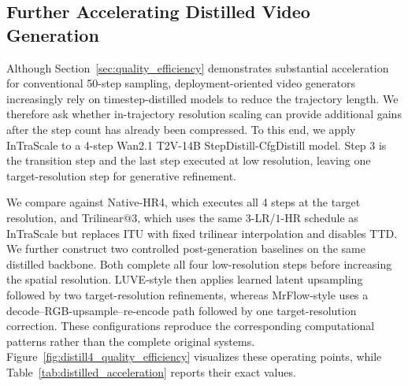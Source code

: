 \documentclass[letterpaper]{article} %
\begin{document}
\subsection{Further Accelerating Distilled Video Generation}
\label{sec:distilled_acceleration}

Although Section~\ref{sec:quality_efficiency} demonstrates substantial
acceleration for conventional 50-step sampling, deployment-oriented
video generators increasingly rely on timestep-distilled models to reduce the
trajectory length. We therefore ask whether in-trajectory resolution scaling
can provide additional gains after the step count has already been
compressed. To this end, we apply InTraScale to a 4-step Wan2.1
T2V-14B StepDistill-CfgDistill model. Step 3 is the transition step
and the last step executed at low resolution, leaving one
target-resolution step for generative refinement.

We compare against Native-HR4, which executes all 4 steps at the
target resolution, and Trilinear@3, which uses the same
\(3\)-LR/\(1\)-HR schedule as InTraScale but replaces ITU with fixed
trilinear interpolation and disables TTD. We further construct two controlled
post-generation baselines on the same distilled backbone. Both complete all
four low-resolution steps before increasing the spatial resolution.
LUVE-style then applies learned latent upsampling followed by two
target-resolution refinements, whereas MrFlow-style uses a
decode--RGB-upsample--re-encode path followed by one target-resolution
correction. These configurations reproduce the corresponding computational
patterns rather than the complete original systems.
Figure~\ref{fig:distill4_quality_efficiency} visualizes these operating points,
while Table~\ref{tab:distilled_acceleration} reports their exact values.
\end{document}
